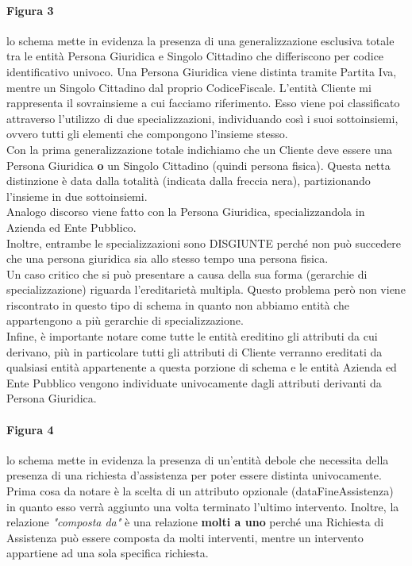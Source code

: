 \documentclass[legalpaper]{article}
\begin{document}
\paragraph{Figura 3}
lo schema mette in evidenza la presenza di una generalizzazione esclusiva totale tra le entità Persona Giuridica e Singolo Cittadino che differiscono per codice identificativo univoco. Una Persona Giuridica viene distinta tramite Partita Iva, mentre un Singolo Cittadino dal proprio CodiceFiscale.
L'entità Cliente mi rappresenta il sovrainsieme a cui facciamo riferimento. Esso viene poi classificato attraverso l'utilizzo di due specializzazioni, individuando così i suoi sottoinsiemi, ovvero tutti gli elementi che compongono l'insieme stesso. \\
		Con la prima generalizzazione totale indichiamo che un Cliente deve essere una Persona Giuridica \textbf{o} un Singolo Cittadino (quindi persona fisica). Questa netta distinzione è data dalla totalità (indicata dalla freccia nera), partizionando l'insieme in due sottoinsiemi.\\
		Analogo discorso viene fatto con la Persona Giuridica, specializzandola in Azienda ed Ente Pubblico.\\
		Inoltre, entrambe le specializzazioni sono DISGIUNTE perché non può succedere che una persona giuridica sia allo stesso tempo una persona fisica.\\
		Un caso critico che si può presentare a causa della sua forma (gerarchie di specializzazione) riguarda l'ereditarietà multipla. Questo problema però non viene riscontrato in questo tipo di schema in quanto non abbiamo entità che appartengono a più gerarchie di specializzazione.\\
		Infine, è importante notare come tutte le entità ereditino gli attributi da cui derivano, più in particolare tutti gli attributi di Cliente verranno ereditati da qualsiasi entità appartenente a questa porzione di schema e le entità Azienda ed Ente Pubblico vengono individuate univocamente dagli attributi derivanti da Persona Giuridica.\\
\paragraph{Figura 4} 
lo schema mette in evidenza la presenza di un'entità debole che necessita della presenza di una richiesta d'assistenza per poter essere distinta univocamente.
Prima cosa da notare è la scelta di un attributo opzionale (dataFineAssistenza) in quanto esso verrà aggiunto una volta terminato l'ultimo intervento.
		Inoltre, la relazione \textit{"composta da"} è una relazione \textbf{molti a uno} perché una Richiesta di Assistenza può essere composta da molti interventi, mentre un intervento 
		appartiene ad una sola specifica richiesta.\\
\end{document}
